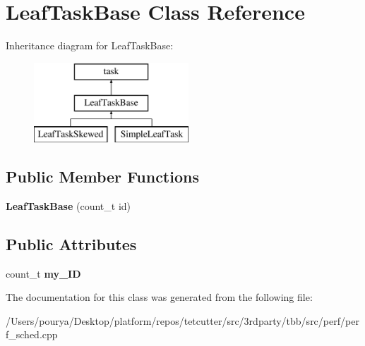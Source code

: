 \hypertarget{classLeafTaskBase}{}\section{Leaf\+Task\+Base Class Reference}
\label{classLeafTaskBase}
Inheritance diagram for Leaf\+Task\+Base\+:\begin{figure}[H]
\begin{center}
\leavevmode
\includegraphics[height=3.000000cm]{classLeafTaskBase}
\end{center}
\end{figure}
\subsection*{Public Member Functions}
\begin{DoxyCompactItemize}
\item 
\hypertarget{classLeafTaskBase_ac08de00200c39edf5e5a10e4826018a7}{}{\bfseries Leaf\+Task\+Base} (count\+\_\+t id)\label{classLeafTaskBase_ac08de00200c39edf5e5a10e4826018a7}

\end{DoxyCompactItemize}
\subsection*{Public Attributes}
\begin{DoxyCompactItemize}
\item 
\hypertarget{classLeafTaskBase_aaa851196942e5fd1594757d50cf9bdcb}{}count\+\_\+t {\bfseries my\+\_\+\+I\+D}\label{classLeafTaskBase_aaa851196942e5fd1594757d50cf9bdcb}

\end{DoxyCompactItemize}


The documentation for this class was generated from the following file\+:\begin{DoxyCompactItemize}
\item 
/\+Users/pourya/\+Desktop/platform/repos/tetcutter/src/3rdparty/tbb/src/perf/perf\+\_\+sched.\+cpp\end{DoxyCompactItemize}
